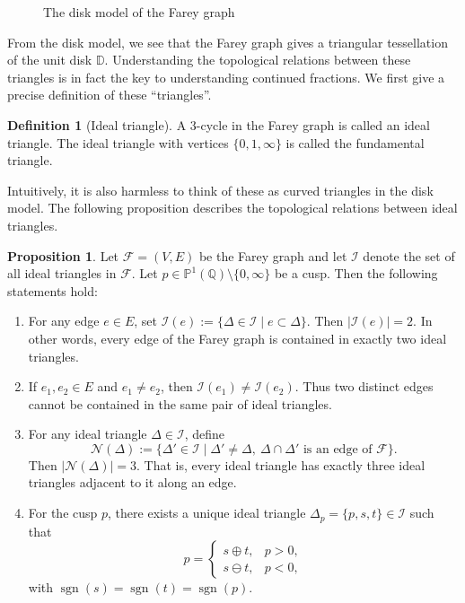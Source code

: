 \documentclass[10pt, a4paper]{article}
\newcommand{\D}{\mathbb{D}}
\theoremstyle{definition}
\newtheorem{proposition}[theorem]{Proposition}
\newtheorem{definition}[theorem]{Definition}
\theoremstyle{remark}
\begin{document}
\begin{figure}[H]
    \centering
    \caption{The disk model of the Farey graph}
    \label{fig:farey_disk}
\end{figure}

From the disk model, we see that the Farey graph gives a triangular tessellation of the unit disk \(\D\). Understanding the topological relations between these triangles is in fact the key to understanding continued fractions. We first give a precise definition of these ``triangles''.

\begin{definition}[Ideal triangle]
    A \(3\)-cycle in the Farey graph is called an ideal triangle. The ideal triangle with vertices \(\{0,1,\infty\}\) is called the fundamental triangle.
\end{definition}

Intuitively, it is also harmless to think of these as curved triangles in the disk model. The following proposition describes the topological relations between ideal triangles.

\begin{proposition}\label{2}
Let \(\mathcal F=(V,E)\) be the Farey graph and let \(\mathcal I\) denote the set of all ideal triangles in \(\mathcal F\). Let
$
p\in \mathbb P^1(\mathbb Q)\setminus\{0,\infty\}
$
be a cusp. Then the following statements hold:
\begin{enumerate}
    \item For any edge \(e\in E\), set
    \(
        \mathcal I(e):=\{\Delta\in\mathcal I\mid e\subset \Delta\}.
    \)
    Then
    \(
        |\mathcal I(e)|=2.
    \)
    In other words, every edge of the Farey graph is contained in exactly two ideal triangles.

    \item If \(e_1,e_2\in E\) and \(e_1\neq e_2\), then
    \(
        \mathcal I(e_1)\neq \mathcal I(e_2).
    \)
    Thus two distinct edges cannot be contained in the same pair of ideal triangles.

    \item For any ideal triangle \(\Delta\in\mathcal I\), define
    \[
        \mathcal N(\Delta)
        :=
        \{\Delta'\in\mathcal I\mid \Delta'\neq \Delta,\ 
        \Delta\cap\Delta' \text{ is an edge of } \mathcal F\}.
    \]
    Then
    \(
        |\mathcal N(\Delta)|=3.
    \)
    That is, every ideal triangle has exactly three ideal triangles adjacent to it along an edge.

    \item For the cusp \(p\), there exists a unique ideal triangle
    \(
        \Delta_p=\{p,s,t\}\in\mathcal I
    \)
    such that
    \[
        p=
        \begin{cases}
        s\oplus t, & p>0,\\
        s\ominus t, & p<0,
        \end{cases}
    \]
    with
    \(
        \operatorname{sgn}(s)=\operatorname{sgn}(t)=\operatorname{sgn}(p).
    \)
\end{enumerate}
\end{proposition}
\end{document}
